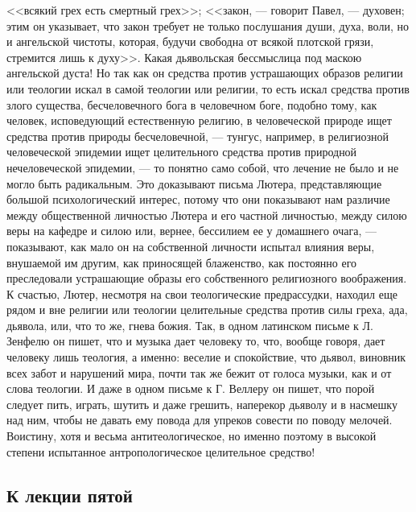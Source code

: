 \documentclass[12pt]{article}
\begin{document}
<<всякий грех есть смертный грех>>; <<закон, --- говорит Павел, --- духовен; этим он указывает, что закон требует не только послушания души, духа, воли, но и ангельской чистоты, которая, будучи свободна от всякой плотской грязи, стремится лишь к духу>>. Какая дьявольская бессмыслица под маскою ангельской дуста! Но так как он средства против устрашающих образов религии или теологии искал в самой теологии или религии, то есть искал средства против злого существа, бесчеловечного бога в человечном боге, подобно тому, как человек, исповедующий естественную религию, в человеческой природе ищет средства против природы бесчеловечной, --- тунгус, например, в религиозной человеческой эпидемии ищет целительного средства против природной нечеловеческой эпидемии, --- то понятно само собой, что лечение не было и не могло быть радикальным. Это доказывают письма Лютера, представляющие большой психологический интерес, потому что они показывают нам различие между общественной личностью Лютера и его частной личностью, между силою веры на кафедре и силою или, вернее, бессилием ее у домашнего очага, --- показывают, как мало он на собственной личности испытал влияния веры, внушаемой им другим, как приносящей блаженство, как постоянно его преследовали устрашающие образы его собственного религиозного воображения. К счастью, Лютер, несмотря на свои теологические предрассудки, находил еще рядом и вне религии или теологии целительные средства против силы греха, ада, дьявола, или, что то же, гнева божия. Так, в одном латинском письме к Л. Зенфелю он пишет, что и музыка дает человеку то, что, вообще говоря, дает человеку лишь теология, а именно: веселие и спокойствие, что дьявол, виновник всех забот и нарушений мира, почти так же бежит от голоса музыки, как и от слова теологии. И даже в одном письме к Г. Веллеру он пишет, что порой следует пить, играть, шутить и даже грешить, наперекор дьяволу и в насмешку над ним, чтобы не давать ему повода для упреков совести по поводу мелочей. Воистину, хотя и весьма антитеологическое, но именно поэтому в высокой степени испытанное антропологическое целительное средство! 
\subsection*{К лекции пятой}
\end{document}
